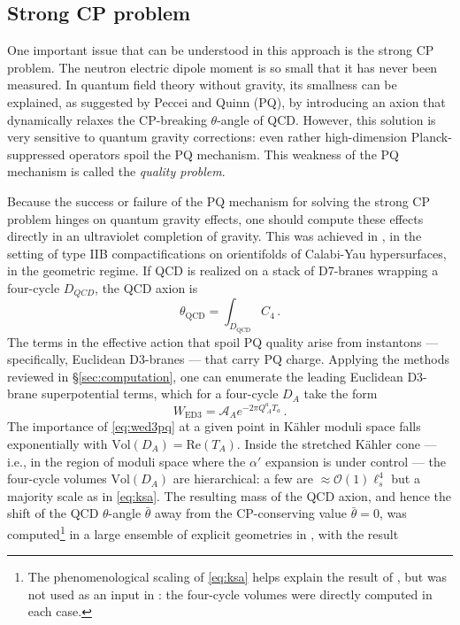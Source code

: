 \documentclass[12pt,a4wide]{article}
\begin{document}
\subsection{Strong CP problem}
One important issue that can be understood in this approach is the strong CP problem.  The neutron electric dipole moment is so small that it has never been measured.  In quantum field theory without gravity, its smallness can be explained, as suggested by Peccei and Quinn (PQ), by introducing an axion that dynamically relaxes the CP-breaking $\theta$-angle of QCD.  However, this solution is very sensitive to quantum gravity corrections: even rather high-dimension Planck-suppressed operators spoil the PQ mechanism.  This weakness of the PQ mechanism is called the \emph{quality problem}.

Because the success or failure of the PQ mechanism for solving the strong CP problem hinges on quantum gravity effects, one should compute these effects directly in an ultraviolet completion of gravity.  This was achieved in \cite{Demirtas:2021gsq}, in the setting of type IIB compactifications on orientifolds of Calabi-Yau hypersurfaces, in the geometric regime.  If QCD is realized on a stack of D7-branes wrapping a four-cycle $D_{QCD}$, the QCD axion is  
\begin{equation}
\theta_{\text{QCD}} = \int_{D_{\text{QCD}}} C_4\,.
\end{equation}
The terms in the effective action that spoil PQ quality arise from instantons --- specifically, Euclidean D3-branes --- that carry PQ charge.  Applying the methods reviewed in \S\ref{sec:computation}, one can enumerate the leading Euclidean D3-brane superpotential terms, which for a four-cycle $D_A$ take the form
\begin{equation}\label{eq:wed3pq}
W_{\text{ED3}} = \mathcal{A}_A e^{-2\pi Q^{a}_{~A} T_a}\,.
\end{equation}
The importance of \eqref{eq:wed3pq} at a given point in K\"ahler moduli space falls exponentially with $\text{Vol}(D_A) = \text{Re}(T_A)$.
Inside the stretched K\"ahler cone --- i.e., in the region of moduli space where the $\alpha'$ expansion is under control 
--- the four-cycle volumes $\text{Vol}(D_A)$ are hierarchical: a few are $\approx \mathcal{O}(1) \ell_s^4$ but a majority scale as in \eqref{eq:ksa}.  The resulting mass of the QCD axion, and hence the shift of the QCD $\theta$-angle $\bar{\theta}$ away from the CP-conserving value $\bar{\theta}=0$, was computed\footnote{The phenomenological scaling of \eqref{eq:ksa} helps explain the result of \cite{Demirtas:2021gsq}, but was not used as an input in \cite{Demirtas:2021gsq}: the four-cycle volumes were directly computed in each case.} in a large ensemble of explicit geometries in \cite{Demirtas:2021gsq}, with the result
\end{document}
